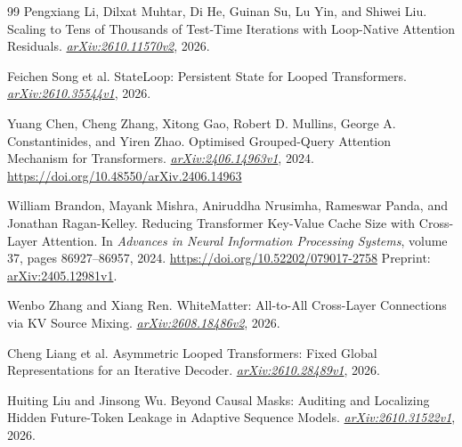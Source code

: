 \documentclass[11pt,letterpaper]{article}
\begin{document}
\begin{thebibliography}{99}
Pengxiang Li, Dilxat Muhtar, Di He, Guinan Su, Lu Yin, and Shiwei Liu.
\newblock Scaling to Tens of Thousands of Test-Time Iterations with Loop-Native Attention Residuals.
\newblock \href{https://arxiv.org/abs/2610.11570v2}{\emph{arXiv:2610.11570v2}}, 2026.

Feichen Song et al.
\newblock StateLoop: Persistent State for Looped Transformers.
\newblock \href{https://arxiv.org/abs/2610.35544v1}{\emph{arXiv:2610.35544v1}}, 2026.

Yuang Chen, Cheng Zhang, Xitong Gao, Robert D. Mullins, George A. Constantinides, and Yiren Zhao.
\newblock Optimised Grouped-Query Attention Mechanism for Transformers.
\newblock \href{https://arxiv.org/abs/2406.14963v1}{\emph{arXiv:2406.14963v1}}, 2024.
\newblock \url{https://doi.org/10.48550/arXiv.2406.14963}

William Brandon, Mayank Mishra, Aniruddha Nrusimha, Rameswar Panda, and Jonathan Ragan-Kelley.
\newblock Reducing Transformer Key-Value Cache Size with Cross-Layer Attention.
\newblock In \emph{Advances in Neural Information Processing Systems}, volume 37, pages 86927--86957, 2024.
\newblock \url{https://doi.org/10.52202/079017-2758}
\newblock Preprint: \href{https://arxiv.org/abs/2405.12981v1}{arXiv:2405.12981v1}.

Wenbo Zhang and Xiang Ren.
\newblock WhiteMatter: All-to-All Cross-Layer Connections via KV Source Mixing.
\newblock \href{https://arxiv.org/abs/2608.18486v2}{\emph{arXiv:2608.18486v2}}, 2026.

Cheng Liang et al.
\newblock Asymmetric Looped Transformers: Fixed Global Representations for an Iterative Decoder.
\newblock \href{https://arxiv.org/abs/2610.28489v1}{\emph{arXiv:2610.28489v1}}, 2026.

Huiting Liu and Jinsong Wu.
\newblock Beyond Causal Masks: Auditing and Localizing Hidden Future-Token Leakage in Adaptive Sequence Models.
\newblock \href{https://arxiv.org/abs/2610.31522v1}{\emph{arXiv:2610.31522v1}}, 2026.
\end{thebibliography}
\end{document}
